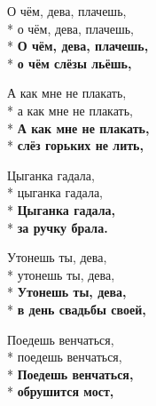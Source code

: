 \medskip

\begin{minipage}{\linewidth}
О чём, дева, плачешь,\\*
о чём, дева, плачешь,\\*
\textbf{О чём, дева, плачешь,}\\*
\textbf{о чём слёзы льёшь,}\\
\end{minipage}\par\medskip\nobreak

\medskip

\begin{minipage}{\linewidth}
А как мне не плакать,\\*
а как мне не плакать,\\*
\textbf{А как мне не плакать,}\\*
\textbf{слёз горьких не лить,}\\
\end{minipage}\par\medskip\nobreak

\medskip

\begin{minipage}{\linewidth}
Цыганка гадала,\\*
цыганка гадала,\\*
\textbf{Цыганка гадала,}\\*
\textbf{за ручку брала.}\\
\end{minipage}\par\medskip\nobreak

\medskip

\begin{minipage}{\linewidth}
Утонешь ты, дева,\\*
утонешь ты, дева,\\*
\textbf{Утонешь ты, дева,}\\*
\textbf{в день свадьбы своей,}\\
\end{minipage}\par\medskip\nobreak

\medskip

\begin{minipage}{\linewidth}
Поедешь венчаться,\\*
поедешь венчаться,\\*
\textbf{Поедешь венчаться,}\\*
\textbf{обрушится мост,}\\
\end{minipage}\par\medskip\nobreak

